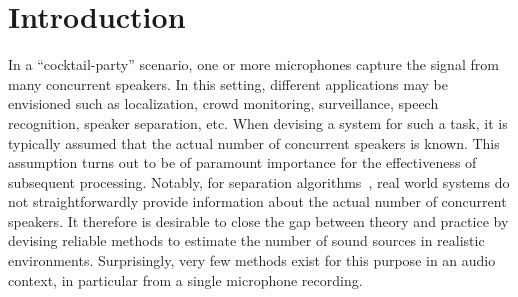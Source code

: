 \section{Introduction}%
\label{sec:introduction}
In a ``cocktail-party'' scenario, one or more microphones capture the signal from many concurrent speakers. In this setting, different applications may be envisioned such as localization, crowd monitoring, surveillance, speech recognition, speaker separation, etc.
When devising a system for such a task, it is typically assumed that the actual number of concurrent speakers is known.
This assumption turns out to be of paramount importance for the effectiveness of subsequent processing.
Notably, for separation algorithms~\cite{common10},
real world systems do not straightforwardly provide information about the actual number of concurrent speakers.
It therefore is desirable to close the gap between theory and practice by devising reliable methods to estimate the number of sound sources in realistic environments.
Surprisingly, very few methods exist for this purpose in an audio context, in particular from a single microphone recording.

\par

